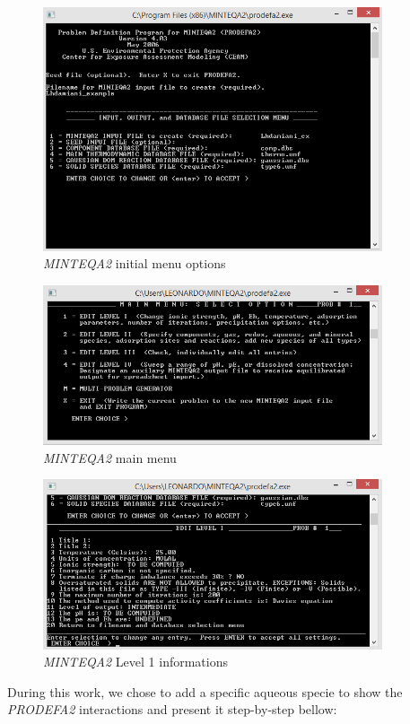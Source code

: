 \documentclass[ppgc,mestrado,English]{iiufrgs}
\begin{document}
\begin{figure}[ht!]
\centering
\includegraphics[width=100mm]{minteq-init.png}
\caption{\emph{MINTEQA2} initial menu options}
\label{minteq:init}
\end{figure}

\begin{figure}[ht!]
\centering
\includegraphics[width=100mm]{minteq-level0.png}
\caption{\emph{MINTEQA2} main menu}
\label{minteq:level0}
\end{figure}

\begin{figure}[ht!]
\centering
\includegraphics[width=100mm]{minteq-level1.png}
\caption{\emph{MINTEQA2} Level 1 informations}
\label{minteq:level1}
\end{figure}


During this work, we chose to add a specific aqueous specie to show the \emph{PRODEFA2} interactions and present it step-by-step bellow:
\end{document}
